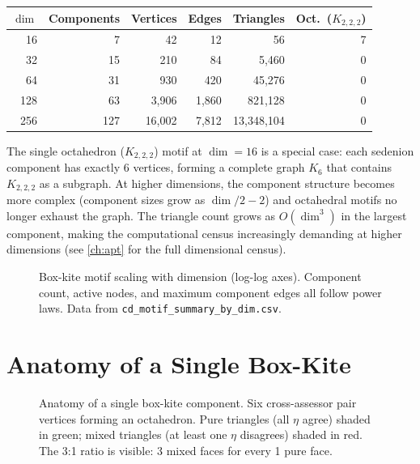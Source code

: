 \documentclass[12pt,openany]{report}
\theoremstyle{definition}
\theoremstyle{plain}
\theoremstyle{remark}
\begin{document}
\begin{center}
\begin{tabular}{rrrrrr}
\toprule
$\dim$ & Components & Vertices & Edges & Triangles & Oct.\ ($K_{2,2,2}$) \\
\midrule
16  &   7 &     42 &     12 &      56 & 7 \\
32  &  15 &    210 &     84 &   5,460 & 0 \\
64  &  31 &    930 &    420 &  45,276 & 0 \\
128 &  63 &  3,906 &  1,860 & 821,128 & 0 \\
256 & 127 & 16,002 &  7,812 & 13,348,104 & 0 \\
\bottomrule
\end{tabular}
\end{center}

The single octahedron ($K_{2,2,2}$) motif at $\dim = 16$ is a special
case: each sedenion component has exactly 6 vertices, forming a complete
graph $K_6$ that contains $K_{2,2,2}$ as a subgraph.  At higher
dimensions, the component structure becomes more complex (component sizes
grow as $\dim/2 - 2$) and octahedral motifs no longer exhaust the graph.
The triangle count grows as $O(\dim^3)$ in the largest component, making
the computational census increasingly demanding at higher dimensions
(see \cref{ch:apt} for the full dimensional census).

\begin{figure}[htbp]
\centering

\caption{Box-kite motif scaling with dimension (log-log axes).
Component count, active nodes, and maximum component edges all follow
power laws.  Data from \texttt{cd\_motif\_summary\_by\_dim.csv}.}
\label{fig:motif-scaling}
\end{figure}

\section{Anatomy of a Single Box-Kite}

\begin{figure}[htbp]
\centering

\caption{Anatomy of a single box-kite component.  Six cross-assessor
pair vertices forming an octahedron.  Pure triangles (all $\eta$ agree)
shaded in \textcolor{OIgreen}{green}; mixed triangles (at least one
$\eta$ disagrees) shaded in \textcolor{OIvermillion}{red}.  The 3:1
ratio is visible: 3 mixed faces for every 1 pure face.}
\label{fig:boxkite-detail}
\end{figure}
\end{document}
